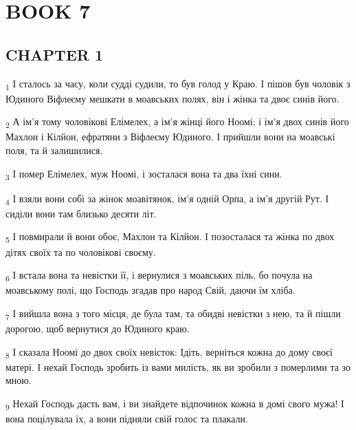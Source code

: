 \section{BOOK 7}
\subsection{CHAPTER 1}
\begin{tcolorbox}
\textsubscript{1} І сталось за часу, коли судді судили, то був голод у Краю. І пішов був чоловік з Юдиного Віфлеєму мешкати в моавських полях, він і жінка та двоє синів його.
\end{tcolorbox}
\begin{tcolorbox}
\textsubscript{2} А ім'я тому чоловікові Елімелех, а ім'я жінці його Ноомі; і ім'я двох синів його Махлон і Кілйон, ефратяни з Віфлеєму Юдиного. І прийшли вони на моавські поля, та й залишилися.
\end{tcolorbox}
\begin{tcolorbox}
\textsubscript{3} І помер Елімелех, муж Ноомі, і зосталася вона та два їхні сини.
\end{tcolorbox}
\begin{tcolorbox}
\textsubscript{4} І взяли вони собі за жінок моавітянок, ім'я одній Орпа, а ім'я другій Рут. І сиділи вони там близько десяти літ.
\end{tcolorbox}
\begin{tcolorbox}
\textsubscript{5} І повмирали й вони обоє, Махлон та Кілйон. І позосталася та жінка по двох дітях своїх та по чоловікові своєму.
\end{tcolorbox}
\begin{tcolorbox}
\textsubscript{6} І встала вона та невістки її, і вернулися з моавських піль, бо почула на моавському полі, що Господь згадав про народ Свій, даючи їм хліба.
\end{tcolorbox}
\begin{tcolorbox}
\textsubscript{7} І вийшла вона з того місця, де була там, та обидві невістки з нею, та й пішли дорогою, щоб вернутися до Юдиного краю.
\end{tcolorbox}
\begin{tcolorbox}
\textsubscript{8} І сказала Ноомі до двох своїх невісток: Ідіть, верніться кожна до дому своєї матері. І нехай Господь зробить із вами милість, як ви зробили з померлими та зо мною.
\end{tcolorbox}
\begin{tcolorbox}
\textsubscript{9} Нехай Господь дасть вам, і ви знайдете відпочинок кожна в домі свого мужа! І вона поцілувала їх, а вони підняли свій голос та плакали.
\end{tcolorbox}
